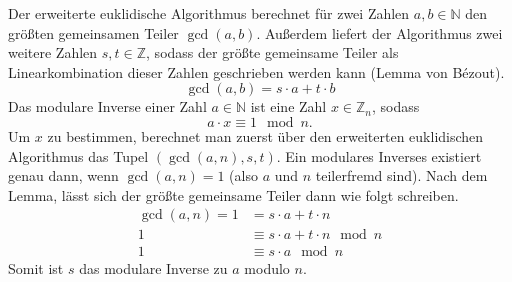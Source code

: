 Der erweiterte euklidische Algorithmus berechnet für zwei Zahlen $a,b\in\mathbb{N}$
den größten gemeinsamen Teiler $\gcd(a,b)$. Außerdem liefert der Algorithmus zwei
weitere Zahlen $s,t\in\mathbb{Z}$, sodass der größte gemeinsame Teiler als Linearkombination
dieser Zahlen geschrieben werden kann (Lemma von Bézout).
\[
    \gcd(a,b) = s\cdot a + t \cdot b
\]
Das modulare Inverse einer Zahl $a\in \mathbb{N}$ ist eine Zahl $x\in\mathbb{Z}_n$, sodass
\[
    a\cdot x \equiv 1 \mod n.
\]
Um $x$ zu bestimmen, berechnet man zuerst über den erweiterten euklidischen Algorithmus
das Tupel $(\gcd(a, n), s, t)$. Ein modulares Inverses existiert genau dann, wenn
$\gcd(a,n) = 1$ (also $a$ und $n$ teilerfremd sind). Nach dem Lemma, lässt sich
der größte gemeinsame Teiler dann wie folgt schreiben.
\begin{align*}
    \gcd(a,n) = 1 &= s\cdot a + t\cdot n\\
    1 &\equiv s\cdot a + t\cdot n\mod n\\
    1 &\equiv s\cdot a\mod n
\end{align*}
Somit ist $s$ das modulare Inverse zu $a$ modulo $n$.
